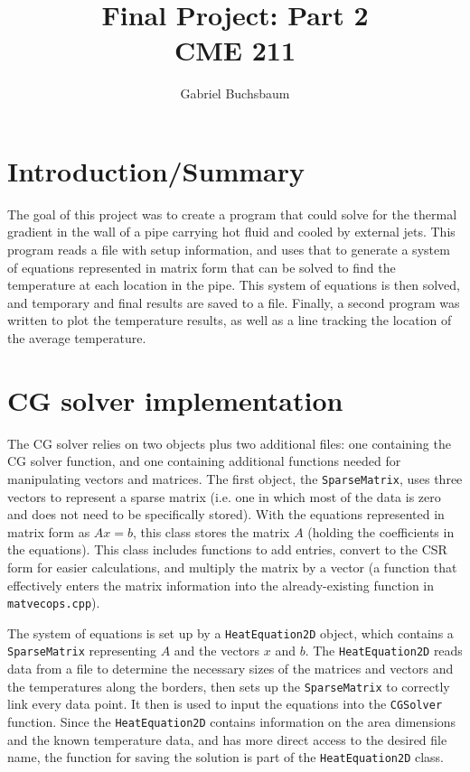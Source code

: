 \documentclass{article}
\title{Final Project: Part 2 \\CME 211}
\author{Gabriel Buchsbaum}
\begin{document}
\lstset{language=C++}
\maketitle

\section{Introduction/Summary}

The goal of this project was to create a program that could solve for the thermal gradient in the wall of a pipe carrying hot fluid and cooled by external jets.  This program reads a file with setup information, and uses that to generate a system of equations represented in matrix form that can be solved to find the temperature at each location in the pipe.  This system of equations is then solved, and temporary and final results are saved to a file.  Finally, a second program was written to plot the temperature results, as well as a line tracking the location of the average temperature.

\section{CG solver implementation}

The CG solver relies on two objects plus two additional files: one containing the CG solver function, and one containing additional functions needed for manipulating vectors and matrices. The first object, the \texttt{SparseMatrix}, uses three vectors to represent a sparse matrix (i.e. one in which most of the data is zero and does not need to be specifically stored).  With the equations represented in matrix form as $Ax=b$, this class stores the matrix $A$ (holding the coefficients in the equations).  This class includes functions to add entries, convert to the CSR form for easier calculations, and multiply the matrix by a vector (a function that effectively enters the matrix information into the already-existing function in \texttt{matvecops.cpp}).

The system of equations is set up by a \texttt{HeatEquation2D} object, which contains a \texttt{SparseMatrix} representing $A$ and the vectors $x$ and $b$. The \texttt{HeatEquation2D} reads data from a file to determine the necessary sizes of the matrices and vectors and the temperatures along the borders, then sets up the \texttt{SparseMatrix} to correctly link every data point.  It then is used to input the equations into the \texttt{CGSolver} function.  Since the \texttt{HeatEquation2D} contains information on the area dimensions and the known temperature data, and has more direct access to the desired file name, the function for saving the solution is part of the \texttt{HeatEquation2D} class.
\end{document}
